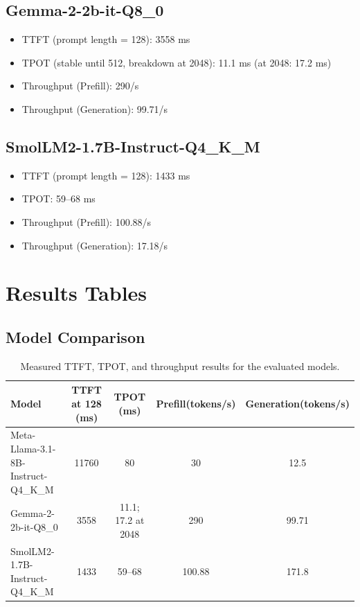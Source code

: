 \documentclass[11pt,a4paper]{article}
\begin{document}
\subsection{Gemma-2-2b-it-Q8\_0}

\begin{itemize}
    \item TTFT (prompt length = 128): 3558 ms
    \item TPOT (stable until 512, breakdown at 2048): 11.1 ms (at 2048: 17.2 ms)
    \item Throughput (Prefill): 290/s
    \item Throughput (Generation): 99.71/s
\end{itemize}

\subsection{SmolLM2-1.7B-Instruct-Q4\_K\_M}

\begin{itemize}
    \item TTFT (prompt length = 128): 1433 ms
    \item TPOT: 59--68 ms
    \item Throughput (Prefill): 100.88/s
    \item Throughput (Generation): 17.18/s
\end{itemize}

    \appendix
    \section{Results Tables}
    \label{sec:appendix_results_tables}

    \subsection{Model Comparison}
    \begin{table}[H]
    \centering
    \small
    \setlength{\tabcolsep}{4pt}
    \begin{tabularx}{\textwidth}{X|c|c|c|c}
        \toprule
        Model & TTFT at 128 (ms) & TPOT (ms) & Prefill(tokens/s) & Generation(tokens/s) \\
        \midrule
        Meta-Llama-3.1-8B-Instruct-Q4\_K\_M
        & 11760
        & 80
        & 30
        & 12.5 \\

        Gemma-2-2b-it-Q8\_0
        & 3558
        & 11.1; 17.2 at 2048
        & 290
        & 99.71 \\

        SmolLM2-1.7B-Instruct-Q4\_K\_M
        & 1433
        & 59--68
        & 100.88
        & 171.8 \\
        \bottomrule
    \end{tabularx}
    \caption{Measured TTFT, TPOT, and throughput results for the evaluated models.}
    \label{tab:model_performance_summary}
    \end{table}
\end{document}
